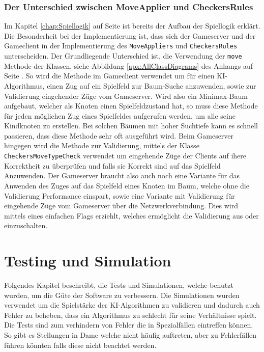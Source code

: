 \documentclass[12pt,a4paper,bibliography=totocnumbered,listof=totocnumbered]{article}
\begin{document}
\subsubsection{Der Unterschied zwischen MoveApplier und CheckersRules}
\label{chap:Moves}
Im Kapitel \ref{chap:Spiellogik} auf Seite \pageref{chap:Spiellogik} ist bereits der Aufbau der Spiellogik erklärt. Die Besonderheit bei der Implementierung ist, dass sich der Gameserver und 
der Gameclient in der Implementierung des \texttt{MoveAppliers} und \texttt{CheckersRules} unterscheiden. Der Grundliegende Unterschied ist,
die Verwendung der \texttt{move} Methode der Klassen, siehe Abbildung \ref{apx:AllClassDiagrams} des Anhangs auf Seite \pageref{apx:AllClassDiagrams}. 
So wird die Methode im Gameclient verwendet um für einen KI-Algorithmus, einen Zug auf ein Spielfeld zur Baum-Suche anzuwenden, sowie zur Validierung eingehender Züge vom
Gameserver. Wird also ein Minimax-Baum aufgebaut, welcher als Knoten einen Spielfeldzustand hat, so muss diese Methode für jeden möglichen Zug eines 
Spielfeldes aufgerufen werden, um alle seine Kindknoten zu erstellen. Bei solchen Bäumen mit hoher Suchtiefe kann es schnell passieren, 
dass diese Methode sehr oft ausgeführt wird.
Beim Gameserver hingegen wird die Methode zur Validierung, mittels der Klasse \texttt{CheckersMoveTypeCheck} verwendet um eingehende Züge der Clients 
auf ihere Korrektheit zu überprüfen und falls sie Korrekt sind auf das Spielfeld Anzuwenden. 
Der Gameserver braucht also auch noch eine Variante für das Anwenden des Zuges auf das Spielfeld eines Knoten im Baum, welche ohne die Validierung Performance einspart,
sowie eine Variante mit Validierung für eingehende Züge vom Gameserver über die Netzwerkverbindung.
Dies wird mittels eines einfachen Flags erziehlt, welches ermöglicht die Validierung aus oder einzuschalten.

\section{Testing und Simulation}
Folgendes Kapitel beschreibt, die Tests und Simulationen, welche benutzt wurden, um die Güte der Software zu verbessern. Die Simulationen wurden verwendet um 
die Spielstärke der KI-Algorithmen zu validieren und dadurch auch Fehler zu beheben, dass ein Algorithmus zu schlecht für seine Verhältnisse spielt.
Die Tests sind zum verhindern von Fehler die in Spezialfällen eintreffen können. So gibt es Stellungen in Dame welche nicht häufig auftreten, 
aber zu Fehlerfällen führen könnten falls diese nicht beachtet werden.
\end{document}
